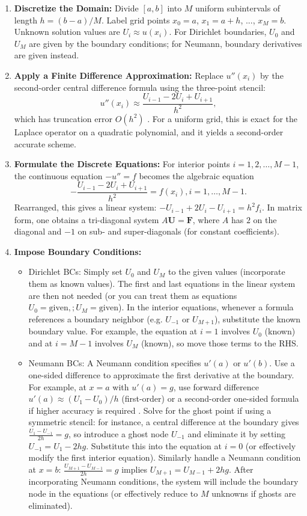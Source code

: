 \documentclass[a4paper,11pt]{report}
\begin{document}
\begin{enumerate}
    \item \textbf{Discretize the Domain:} Divide $[a,b]$ into $M$ uniform subintervals of length $h = (b-a)/M$. Label grid points $x_0 = a$, $x_1 = a+h$, ..., $x_M = b$. Unknown solution values are $U_i \approx u(x_i)$. For Dirichlet boundaries, $U_0$ and $U_M$ are given by the boundary conditions; for Neumann, boundary derivatives are given instead.
    \item \textbf{Apply a Finite Difference Approximation:} Replace $u''(x_i)$ by the second-order central difference formula using the three-point stencil:
          $$u''(x_i) \approx \frac{U_{i-1} - 2U_i + U_{i+1}}{h^2},$$ which has truncation error $O(h^2)$
          \cite{leifh}. For a uniform grid, this is exact for the Laplace operator on a quadratic polynomial, and it yields a second-order accurate scheme.
    \item \textbf{Formulate the Discrete Equations:} For interior points $i=1,2,\dots,M-1$, the continuous equation $-u'' = f$ becomes the algebraic equation
          $$-\frac{U_{i-1} - 2U_i + U_{i+1}}{h^2} = f(x_i), i=1,…,M-1.$$ Rearranged, this gives a linear system: $-U_{i-1} + 2U_i - U_{i+1} = h^2 f_i$. In matrix form, one obtains a tri-diagonal system $A\mathbf{U} = \mathbf{F}$, where $A$ has $2$ on the diagonal and $-1$ on sub- and super-diagonals (for constant coefficients).
    \item \textbf{Impose Boundary Conditions:}
          \begin{itemize}
              \item Dirichlet BCs: Simply set $U_0$ and $U_M$ to the given values (incorporate them as known values). The first and last equations in the linear system are then not needed (or you can treat them as equations
                    $U_0 = \text{given},; U_M = \text{given}$). In the interior equations, whenever a formula references a boundary neighbor (e.g. $U_{-1}$ or $U_{M+1}$), substitute the known boundary value. For example, the equation at $i=1$ involves $U_0$ (known) and at $i=M-1$ involves $U_M$ (known), so move those terms to the RHS.
              \item Neumann BCs: A Neumann condition specifies $u'(a)$ or $u'(b)$. Use a one-sided difference to approximate the first derivative at the boundary. For example, at $x=a$ with $u'(a)=g$, use forward difference $u'(a)\approx (U_1 - U_0)/h$ (first-order) or a second-order one-sided formula if higher accuracy is required
                    \cite{leifh}. Solve for the ghost point if using a symmetric stencil: for instance, a central difference at the boundary gives $\frac{U_1 - U_{-1}}{2h} = g$, so introduce a ghost node $U_{-1}$ and eliminate it by setting $U_{-1} = U_1 - 2hg$. Substitute this into the equation at $i=0$ (or effectively modify the first interior equation). Similarly handle a Neumann condition at $x=b$: $\frac{U_{M+1}-U_{M-1}}{2h}=g$ implies $U_{M+1}=U_{M-1}+2hg$. After incorporating Neumann conditions, the system will include the boundary node in the equations (or effectively reduce to $M$ unknowns if ghosts are eliminated).

\end{itemize}
\end{enumerate}
\end{document}
